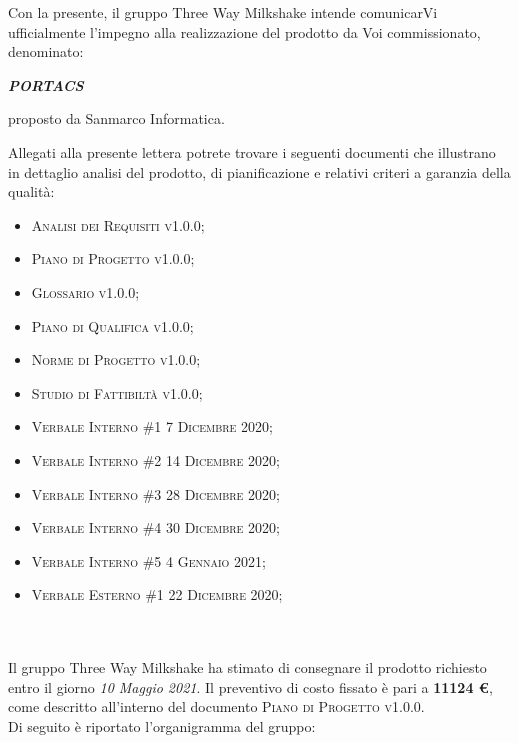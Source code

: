 \documentclass[10pt,stdletter,dateno,sigright]{newlfm}  %
\begin{document}
\begin{newlfm}


Con la presente, il gruppo Three Way Milkshake intende comunicarVi ufficialmente l'impegno alla realizzazione del prodotto da Voi commissionato, denominato:
\begin{center}
    \textbf{\textit{PORTACS}}
\end{center}
proposto da Sanmarco Informatica.

Allegati alla presente lettera potrete trovare i seguenti documenti che illustrano in dettaglio analisi del prodotto, di pianificazione e relativi criteri a garanzia della qualità:

\begin{itemize}
	\item \textsc{Analisi dei Requisiti v1.0.0;}
    \item \textsc{Piano di Progetto v1.0.0;}
    \item \textsc{Glossario v1.0.0;}
    \item \textsc{Piano di Qualifica v1.0.0;}
    \item \textsc{Norme di Progetto v1.0.0;}
    \item \textsc{Studio di Fattibiltà v1.0.0;}
    \item \textsc{Verbale Interno \#1 7 Dicembre 2020;}
    \item \textsc{Verbale Interno \#2 14 Dicembre 2020;}
    \item \textsc{Verbale Interno \#3 28 Dicembre 2020;}
    \item \textsc{Verbale Interno \#4 30 Dicembre 2020;}
    \item \textsc{Verbale Interno \#5 4 Gennaio 2021;}
    \item \textsc{Verbale Esterno \#1 22 Dicembre 2020;}
\end{itemize}   
\ \\
\ \\
Il gruppo Three Way Milkshake ha stimato di consegnare il prodotto richiesto entro il giorno \textit{10 Maggio 2021}. 
Il preventivo di costo fissato \`e pari a \textbf{11124  \euro}, come descritto all'interno del documento \textsc{Piano di Progetto v1.0.0}.
\\

Di seguito \`e riportato l'organigramma del gruppo:
\begin{center}
\begin{tabular}{l|l}


\end{tabular}
\end{center}
\end{newlfm}
\end{document}
